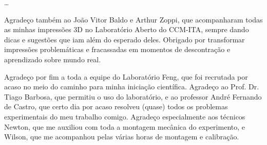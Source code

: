 \dots

Agradeço também ao João Vitor Baldo e Arthur Zoppi, que acompanharam todas as minhas impressões 3D no Laboratório Aberto do CCM-ITA, sempre dando dicas e sugestões que iam além do esperado deles. Obrigado por transformar impressões problemáticas e fracassadas em momentos de descontração e aprendizado sobre mundo real.

Agradeço por fim a toda a equipe do Laboratório Feng, que foi recrutada por acaso no meio do caminho para minha iniciação científica. Agradeço ao Prof. Dr. Tiago Barbosa, que permitiu o uso do laboratório, e ao professor André Fernando de Castro, que certo dia por acaso resolveu (quase) todos os problemas experimentais do meu trabalho comigo. Agradeço especialmente aos técnicos Newton, que me auxiliou com toda a montagem mecânica do experimento, e Wilson, que me acompanhou pelas várias horas de montagem e calibração.